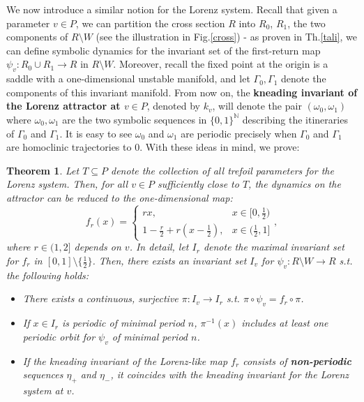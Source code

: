 \documentclass[10pt,reqno]{amsart}
\theoremstyle{plain}
\theoremstyle{assumption}
\theoremstyle{notation}
\theoremstyle{claim}
\theoremstyle{conj}
\theoremstyle{theorem}
\newtheorem{theorem}{Theorem}[section]
\theoremstyle{proposition}
\theoremstyle{corollary}
\begin{document}
We now introduce a similar notion for the Lorenz system. Recall that given a parameter $v\in P$, we can partition the cross section $R$ into $R_0$, $R_1$, the two components of $R\setminus W$ (see the illustration in Fig.\ref{cross}) - as proven in Th.\ref{tali}, we can define symbolic dynamics for the invariant set of the first-return map $\psi_v:R_0\cup R_1\to R$ in ${R}\setminus W$. Moreover, recall the fixed point at the origin is a saddle with a one-dimensional unstable manifold, and let $\Gamma_0,\Gamma_1$ denote the components of this invariant manifold. From now on, the \textbf{kneading invariant of the Lorenz attractor at $v\in P$}, denoted by \textbf{$k_v$}, will denote the pair $(\omega_0,\omega_1)$ where $\omega_0,\omega_1$ are the two symbolic sequences in $\{0,1\}^\mathbb{N}$ describing the itineraries of $\Gamma_0$ and $\Gamma_1$. It is easy to see $\omega_0$ and $\omega_1$ are periodic precisely when $\Gamma_0$ and $\Gamma_1$ are homoclinic trajectories to $0$. With these ideas in mind, we prove:
\begin{theorem}
    \label{reduct} Let $T\subseteq P$ denote the collection of all trefoil parameters for the Lorenz system. Then, for all $v\in P$ sufficiently close to $T$, the dynamics on the attractor can be reduced to the one-dimensional map:  
    \begin{equation}\label{eq:one_dim}
f_{r}(x)=\begin{cases}
			rx, & \text{$x\in[0,\frac{1}{2})$}\\
            1-\frac{r}{2}+r(x-\frac{1}{2}), & \text{$x\in(\frac{1}{2},1]$}
		 \end{cases},
\end{equation}
where $r\in(1,2]$ depends on $v$. In detail, let $I_r$ denote the maximal invariant set for $f_r$ in $[0,1]\setminus\{\frac{1}{2}\}$. Then, there exists an invariant set $I_v$ for  $\psi_v:R\setminus W\to R$ s.t. the following holds:
\begin{itemize}
    \item  There exists a continuous, surjective $\pi:I_v\to I_r$ s.t. $\pi\circ\psi_v=f_r\circ \pi$. 
    \item If $x\in I_r$ is periodic of minimal period $n$, $\pi^{-1}(x)$ includes at least one periodic orbit for $\psi_v$ of minimal period $n$.
    \item If the kneading invariant of the Lorenz-like map $f_r$ consists of \textbf{non-periodic} sequences $\eta_+$ and $\eta_-$, it coincides with the kneading invariant for the Lorenz system at $v$.
\end{itemize}
\end{theorem}
\end{document}
